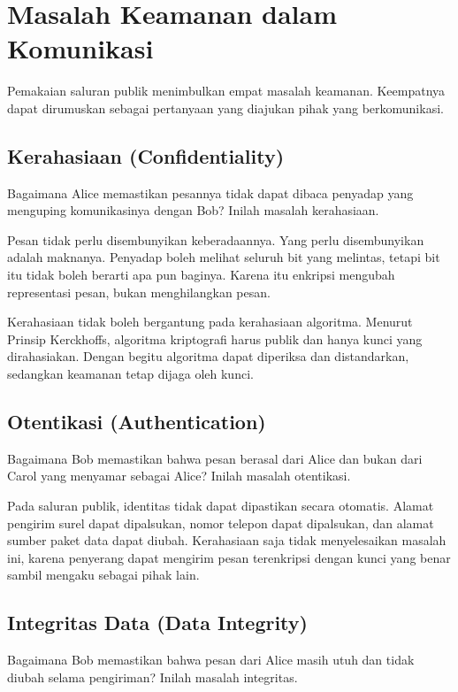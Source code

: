 \section{Masalah Keamanan dalam Komunikasi}
\label{sec:masalah-keamanan}

Pemakaian saluran publik menimbulkan empat masalah keamanan. Keempatnya dapat
dirumuskan sebagai pertanyaan yang diajukan pihak yang berkomunikasi.

\subsection{Kerahasiaan (Confidentiality)}

Bagaimana Alice memastikan pesannya tidak dapat dibaca penyadap yang menguping
komunikasinya dengan Bob? Inilah masalah kerahasiaan.

Pesan tidak perlu disembunyikan keberadaannya. Yang perlu disembunyikan adalah
maknanya. Penyadap boleh melihat seluruh bit yang melintas, tetapi bit itu
tidak boleh berarti apa pun baginya. Karena itu enkripsi mengubah representasi
pesan, bukan menghilangkan pesan.

Kerahasiaan tidak boleh bergantung pada kerahasiaan algoritma. Menurut Prinsip
Kerckhoffs, algoritma kriptografi harus publik dan hanya kunci yang dirahasiakan.
Dengan begitu algoritma dapat diperiksa dan distandarkan, sedangkan keamanan
tetap dijaga oleh kunci.

\subsection{Otentikasi (Authentication)}

Bagaimana Bob memastikan bahwa pesan berasal dari Alice dan bukan dari Carol
yang menyamar sebagai Alice? Inilah masalah otentikasi.

Pada saluran publik, identitas tidak dapat dipastikan secara otomatis. Alamat
pengirim surel dapat dipalsukan, nomor telepon dapat dipalsukan, dan alamat
sumber paket data dapat diubah. Kerahasiaan saja tidak menyelesaikan masalah
ini, karena penyerang dapat mengirim pesan terenkripsi dengan kunci yang benar
sambil mengaku sebagai pihak lain.

\subsection{Integritas Data (Data Integrity)}

Bagaimana Bob memastikan bahwa pesan dari Alice masih utuh dan tidak diubah
selama pengiriman? Inilah masalah integritas.

